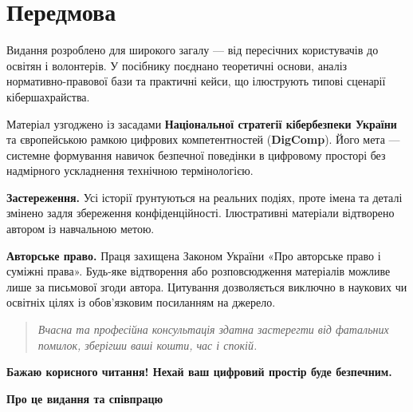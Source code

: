 \chapter*{Передмова}

Видання розроблено для широкого загалу — від пересічних користувачів до освітян і волонтерів. У посібнику поєднано теоретичні основи, аналіз нормативно-правової бази та практичні кейси, що ілюструють типові сценарії кібершахрайства.

Матеріал узгоджено із засадами \textbf{Національної стратегії кібербезпеки України} та європейською рамкою цифрових компетентностей (\textbf{DigComp}). Його мета — системне формування навичок безпечної поведінки в цифровому просторі без надмірного ускладнення технічною термінологією.

\vspace{1em}

\begingroup
\small
\noindent\textbf{Застереження.} Усі історії ґрунтуються на реальних подіях, проте імена та деталі змінено задля збереження конфіденційності. Ілюстративні матеріали відтворено автором із навчальною метою.

\smallskip
\noindent\textbf{Авторське право.} Праця захищена Законом України «Про авторське право і суміжні права». Будь-яке відтворення або розповсюдження матеріалів можливе лише за письмової згоди автора. Цитування дозволяється виключно в наукових чи освітніх цілях із обов’язковим посиланням на джерело.
\endgroup

\vspace{1.5em}

\begin{quote}
\centering
\itshape
Вчасна та професійна консультація здатна застерегти від фатальних помилок, зберігши ваші кошти, час і спокій.
\end{quote}

\vfill

\noindent\textbf{Бажаю корисного читання! Нехай ваш цифровий простір буде безпечним.}

\clearpage


\thispagestyle{empty}

\vspace*{1.5cm}

\begin{center}
    {\Large \textbf{Про це видання та співпрацю}}
\end{center}

